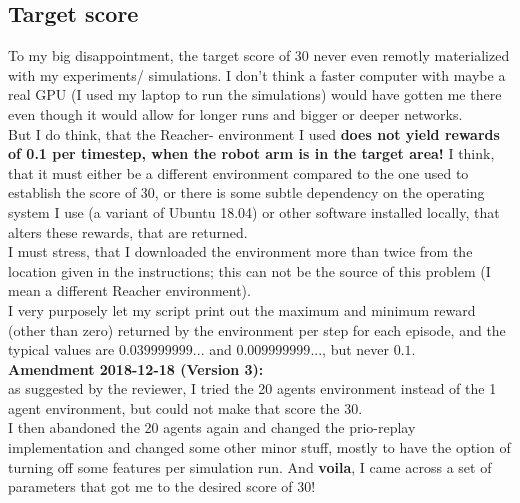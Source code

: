 \documentclass[a4paper]{article}
\begin{document}
\subsection{Target score}
To my big disappointment, the target score of 30 never even remotly materialized
with my experiments/ simulations. I don't think a faster computer with maybe
a real GPU (I used my laptop to run the simulations) would have gotten me there
even though it would allow for longer runs and bigger or deeper networks.
\\
But I do think, that the Reacher- environment I used \textbf{does not yield
rewards of 0.1 per timestep, when the robot arm is in the target area!}
I think, that it must either be a different environment compared to the one
used to establish the score of 30, or there is some subtle dependency on
the operating system I use (a variant of Ubuntu 18.04) or other software
installed locally, that alters these rewards, that are returned.
\\
I must stress, that I downloaded the environment more than twice from the
location given in the instructions; this can not be the source of this problem
(I mean a different Reacher environment).
\\
I very purposely let my script print out the maximum and minimum reward
(other than zero) returned by the environment per step for each episode,
and the typical values are $0.039999999...$ and $0.009999999...$, but never $0.1$.
\\
\textbf{Amendment 2018-12-18 (Version 3):}\\
as suggested by the reviewer, I tried the 20 agents environment instead
of the 1 agent environment, but could not make that score the 30.\\
I then abandoned the 20 agents again and changed the prio-replay
implementation and changed some other minor stuff, mostly to have the option
of turning off some features per simulation run. And \textbf{voila}, I came
across a set of parameters that got me to the desired score of 30!
\end{document}
